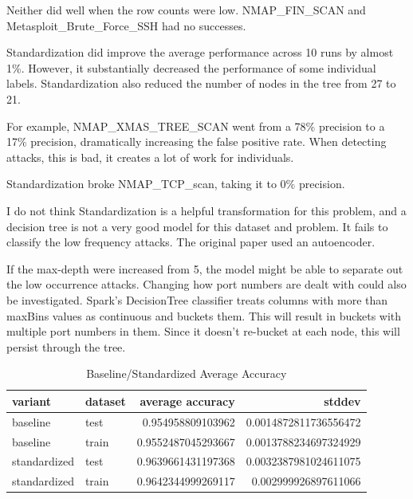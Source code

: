 \documentclass[11pt]{article}
\begin{document}
Neither did well when the row counts were low. NMAP\_FIN\_SCAN and Metasploit\_Brute\_Force\_SSH had no successes.

Standardization did improve the average performance across 10 runs by almost 1\%. However, it substantially decreased the performance of some individual labels. Standardization also reduced the number of nodes in the tree from 27 to 21.

For example, NMAP\_XMAS\_TREE\_SCAN went from a 78\% precision to a 17\% precision, dramatically increasing the false positive rate. When detecting attacks, this is bad, it creates a lot of work for individuals.

Standardization broke NMAP\_TCP\_scan, taking it to 0\% precision.

I do not think Standardization is a helpful transformation for this problem, and a decision tree is not a very good model for this dataset and problem. It fails to classify the low frequency attacks. The original paper used an autoencoder.

If the max-depth were increased from 5, the model might be able to separate out the low occurrence attacks. Changing how port numbers are dealt with could also be investigated. Spark's DecisionTree classifier treats columns with more than maxBins values as continuous and buckets them. This will result in buckets with multiple port numbers in them. Since it doesn't re-bucket at each node, this will persist through the tree.

\begin{table}[H]
	\centering
	\begin{tabular}{ | l | l | r | r | }
		\hline
		\textbf{variant} & \textbf{dataset} & \textbf{average accuracy} & \textbf{stddev} \\
		\hline		
		baseline & test & 0.954958809103962 & 0.0014872811736556472 \\
		\hline
		baseline & train & 0.9552487045293667 & 0.0013788234697324929 \\
		\hline
		standardized & test & 0.9639661431197368 & 0.0032387981024611075 \\
		\hline
		standardized & train & 0.9642344999269117 & 0.002999926897611066 \\
		\hline
	\end{tabular}
\caption{Baseline/Standardized Average Accuracy}
\end{table}	
\end{document}

